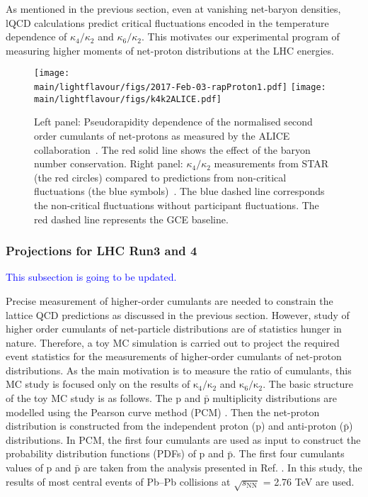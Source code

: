 As mentioned in the previous section, even at vanishing net-baryon densities, lQCD calculations predict critical fluctuations encoded in the temperature dependence of $\kappa_{4}/\kappa_{2}$ and $\kappa_{6}/\kappa_{2}$. This motivates our experimental program  of measuring higher moments of net-proton distributions at the LHC energies. 

\begin{figure}[h]
\begin{center}
\texttt{[image: \\main/lightflavour/figs/2017-Feb-03-rapProton1.pdf]}
\texttt{[image: \\main/lightflavour/figs/k4k2ALICE.pdf]}
\end{center}
\caption{Left panel: Pseudorapidity dependence of the normalised second order cumulants of net-protons as measured by the ALICE collaboration~\cite{Rustamov:2017lio}. The red solid line shows the effect of the baryon number conservation. Right panel: $\kappa_{4}/\kappa_{2}$ measurements from STAR (the red circles) compared to predictions from non-critical fluctuations (the blue symbols)~\cite{Braun-Munzinger:2018yru}. The blue dashed line corresponds the non-critical fluctuations without participant fluctuations. The red dashed line represents the GCE baseline.}  
\label{netpALICE_STAR}
\end{figure}

\subsubsection{Projections for LHC Run3 and 4}
\textcolor{blue}{This subsection is going to be updated.}

Precise measurement of higher-order cumulants are needed to constrain the lattice QCD predictions as discussed in the previous section. However, study of higher order cumulants of net-particle distributions are of statistics hunger in nature. Therefore, a toy MC simulation is carried out to project the required event statistics for the measurements of higher-order cumulants of net-proton distributions. As the main motivation is to measure the ratio of cumulants, this MC study is focused only on the results of $\mathrm{\kappa}_{4}/\mathrm{\kappa}_{2}$ and $\mathrm{\kappa}_{6}/\mathrm{\kappa}_{2}$. The basic structure of the toy MC study is as follows. The p and $\bar{\mathrm{p}}$ multiplicity distributions are modelled using the Pearson curve method (PCM) \cite{Behera:2017xwg}. Then the net-proton distribution is constructed from the independent proton (p) and anti-proton ($\bar{\mathrm{p}}$) distributions. In PCM, the first four cumulants are used as input to construct the probability distribution functions (PDFs) of p and $\bar{\mathrm{p}}$.  The first four cumulants values of p and $\bar{\mathrm{p}}$ are taken from the analysis presented in Ref. \cite{Behera:2018wqk}. In this study, the results of most central events of Pb--Pb collisions at $\sqrt{s_{\mathrm{NN}}}$ = 2.76 TeV are used.


